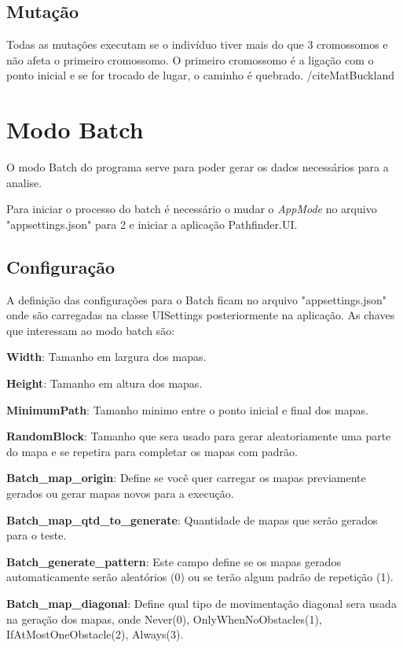 \subsection{Mutação}

Todas as mutações executam se o indivíduo tiver mais do que 3 cromossomos e não afeta o primeiro cromossomo.
O primeiro cromossomo é a ligação com o ponto inicial e se for trocado de lugar, o caminho é quebrado. /cite{MatBuckland}

\section{Modo Batch}

O modo Batch do programa serve para poder gerar os dados necessários para a analise.

Para iniciar o processo do batch é necessário o mudar o \textit{AppMode} no arquivo "appsettings.json" para 2 e iniciar a aplicação Pathfinder.UI.


\subsection{Configuração}

A definição das configurações para o Batch ficam no arquivo "appsettings.json" onde são carregadas na classe UISettings posteriormente na aplicação. As chaves que interessam ao modo batch são:

\textbf{Width}: Tamanho em largura dos mapas.

\textbf{Height}: Tamanho em altura dos mapas.

\textbf{MinimumPath}: Tamanho minimo entre o ponto inicial e final dos mapas.

\textbf{RandomBlock}: Tamanho que sera usado para gerar aleatoriamente uma parte do mapa e se repetira para completar os mapas com padrão.

\textbf{Batch\_map\_origin}: Define se você quer carregar os mapas previamente gerados ou gerar mapas novos para a execução.

\textbf{Batch\_map\_qtd\_to\_generate}: Quantidade de mapas que serão gerados para o teste.

\textbf{Batch\_generate\_pattern}: Este campo define se os mapas gerados automaticamente serão aleatórios (0) ou se terão algum padrão de repetição (1).

\textbf{Batch\_map\_diagonal}: Define qual tipo de movimentação diagonal sera usada na geração dos mapas, onde Never(0), OnlyWhenNoObstacles(1), IfAtMostOneObstacle(2), Always(3).

